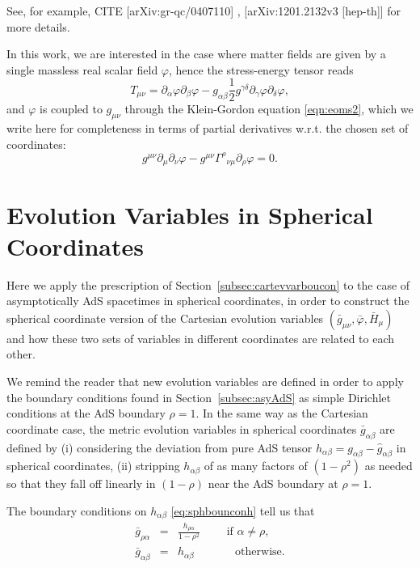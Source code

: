 \documentclass[a4paper,11pt]{article}
\begin{document}
See, for example, CITE [arXiv:gr-qc/0407110] , [arXiv:1201.2132v3 [hep-th]]  for more details.

In this work, we are interested in the case where matter fields are given by a single massless real scalar field $\varphi$, hence the stress-energy tensor reads
\begin{equation}
T_{\mu\nu}=\partial_\alpha \varphi \partial_\beta \varphi - g_{\alpha\beta} \frac{1}{2} g^{\gamma\delta} \partial_{\gamma} \varphi \partial_{\delta} \varphi,
\end{equation}
and $\varphi$ is coupled to $g_{\mu\nu}$ through the Klein-Gordon equation \eqref{eqn:eoms2}, which we write here for completeness in terms of partial derivatives w.r.t. the chosen set of coordinates:
\begin{equation}\label{eqn:eoms2cart}
g^{\mu\nu} \partial_{\mu} \partial_{\nu} \varphi -g^{\mu\nu} \Gamma^{\rho}{}_{\nu\mu}\partial_\rho\varphi= 0.
\end{equation}

\section{Evolution Variables in Spherical Coordinates}\label{sec:sphevvarboucon}

Here we apply the prescription of Section~\ref{subsec:cartevvarboucon} to the case of asymptotically AdS spacetimes in spherical coordinates, in order to construct the spherical coordinate version of the Cartesian evolution variables $(\bar{g}_{\mu\nu},\bar{\varphi},\bar{H}_\mu)$ and how these two sets of variables in different coordinates are related to each other.

We remind the reader that new evolution variables are defined in order to apply the boundary conditions found in Section~\ref{subsec:asyAdS} as simple Dirichlet conditions at the AdS boundary $\rho=1$. In the same way as the Cartesian coordinate case, the metric evolution variables in spherical coordinates $\bar{g}_{\alpha\beta}$ are defined by (i) considering the deviation from pure AdS tensor $h_{\alpha\beta}=g_{\alpha\beta}-\hat{g}_{\alpha\beta}$ in spherical coordinates, (ii) stripping $h_{\alpha\beta}$ of as many factors of $(1-\rho^2)$ as needed so that they fall off linearly in $(1-\rho)$ near the AdS boundary at $\rho=1$.

The boundary conditions on $h_{\alpha\beta}$ \eqref{eq:sphbounconh} tell us that
\begin{eqnarray}\label{eq:gbarsph}
\bar{g}_{\rho\alpha}&=&\frac{h_{\rho\alpha} }{1-\rho^2}\qquad \textrm{ if $\alpha\neq\rho$}, \\ \nonumber
\bar{g}_{\alpha\beta}&=&h_{\alpha\beta}  \qquad\;\;\;\;\, \textrm{ otherwise}.
\end{eqnarray}
\end{document}
